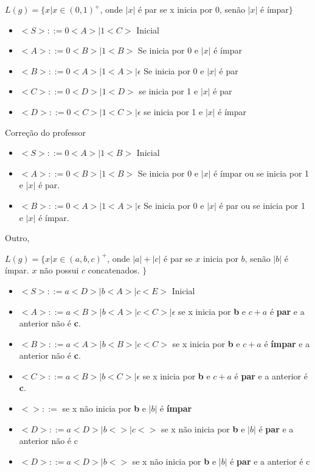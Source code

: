 \documentclass[]{article}
\begin{document}
		$L(g) = \{ x | x \in (0,1)^{+}$, onde $|x|$ é par se x inicia por 0, senão $|x|$ é ímpar$\}$
		\begin{itemize}
			\item $<S>::= 0<A>|1<C>$ Inicial
			\item $<A>::= 0<B>|1<B>$ Se inicia por 0 e $|x|$ é ímpar
			\item $<B>::= 0<A>|1<A>|\epsilon$ Se inicia por 0 e $|x|$ é par
			\item $<C>::= 0<D>|1<D>$ se inicia por 1 e $|x|$ é par
			\item $<D>::= 0<C>|1<C>|\epsilon$ se inicia por 1 e $|x|$ é ímpar
		\end{itemize}
		Correção do professor
		
		\begin{itemize}
			\item $<S>::= 0<A>|1<B>$ Inicial
			\item $<A>::= 0<B>|1<B>$ Se inicia por 0 e $|x|$ é ímpar ou se inicia por 1 e $|x|$ é par.
			\item $<B>::= 0<A>|1<A>|\epsilon$ Se inicia por 0 e $|x|$ é par ou se inicia por 1 e $|x|$ é ímpar.
		\end{itemize}
		Outro,
		
		$L(g) = \{ x | x \in (a,b,c)^{+}$, onde $|a|+|c|$ é par se $x$ inicia por $b$, senão $|b|$ é ímpar. $x$ não possui $c$ concatenados. $\}$

		\begin{itemize}
			\item $<S>::= a<D> | b<A> | c<E> $ Inicial
			\item $<A>::= a<B> | b<A> | c<C> | \epsilon$ se x inicia por \textbf{b} e $c+a$ é \textbf{par} e a anterior não é \textbf{c}.
			\item $<B>::= a<A> | b<B> | c<C> $ se x inicia por \textbf{b} e $c+a$ é \textbf{ímpar} e a anterior não é \textbf{c}.
			\item $<C>::= a<B> | b<C> | \epsilon $ se x inicia por \textbf{b} e $c+a$ é \textbf{par} e a anterior é \textbf{c}.
			\item $<>::= $ se x não inicia por \textbf{b} e $|b|$ é \textbf{ímpar}
			\item $<D>::= a<D> | b<> | c<> $ se x não inicia por \textbf{b} e $|b|$ é \textbf{par} e a anterior não é c
			\item $<D>::= a<D> | b<> $ se x não inicia por \textbf{b} e $|b|$ é \textbf{par} e a anterior é c
		\end{itemize}
		
\end{document}
